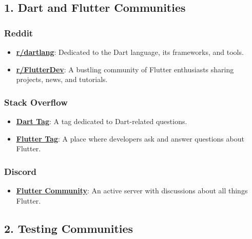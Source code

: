 \documentclass[
]{article}
\providecommand{\tightlist}{%
  \setlength{\itemsep}{0pt}\setlength{\parskip}{0pt}}
\begin{document}
\subsection{1. Dart and Flutter
Communities}\label{dart-and-flutter-communities}

\subsubsection{Reddit}\label{reddit}

\begin{itemize}
\tightlist
\item
  \href{https://www.reddit.com/r/dartlang/}{\textbf{r/dartlang}}:
  Dedicated to the Dart language, its frameworks, and tools.
\item
  \href{https://www.reddit.com/r/FlutterDev/}{\textbf{r/FlutterDev}}: A
  bustling community of Flutter enthusiasts sharing projects, news, and
  tutorials.
\end{itemize}

\subsubsection{Stack Overflow}\label{stack-overflow}

\begin{itemize}
\tightlist
\item
  \href{https://stackoverflow.com/questions/tagged/dart}{\textbf{Dart
  Tag}}: A tag dedicated to Dart-related questions.
\item
  \href{https://stackoverflow.com/questions/tagged/flutter}{\textbf{Flutter
  Tag}}: A place where developers ask and answer questions about
  Flutter.
\end{itemize}

\subsubsection{Discord}\label{discord}

\begin{itemize}
\tightlist
\item
  \href{https://discord.com/invite/N7Yshp4}{\textbf{Flutter Community}}:
  An active server with discussions about all things Flutter.
\end{itemize}

\subsection{2. Testing Communities}\label{testing-communities}
\end{document}
